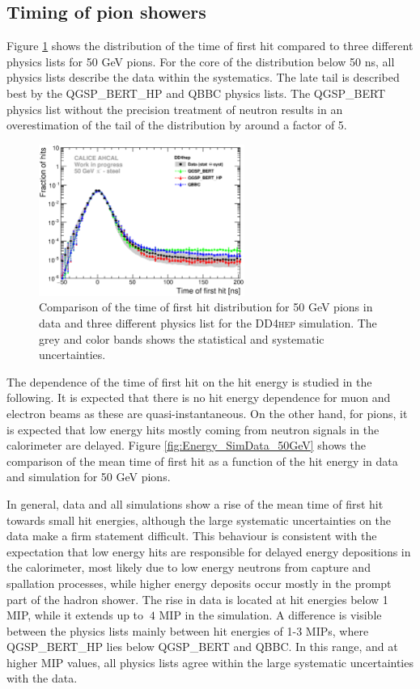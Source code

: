 \documentclass{JINST}
\newcommand\ddhep{\textsc{DD4hep}\xspace}
\begin{document}
\subsection{Timing of pion showers}

Figure \ref{fig:dNdt_SimData_50GeV_DD4hep} shows the distribution of the time of first hit compared to three different physics lists for 50 GeV pions. For the core of the distribution below 50 ns, all physics lists describe the data within the systematics. The late tail is described best by the QGSP\_BERT\_HP and QBBC physics lists. The QGSP\_BERT physics list without the precision treatment of neutron results in an overestimation of the tail of the distribution by around a factor of 5.

\begin{figure}[htbp!]
  \centering
  \includegraphics[width=0.6\textwidth]{fig/Comparison_SimData_Pion50GeV_LateClusters_DD4hep.eps}
  \caption{Comparison of the time of first hit distribution for 50 GeV pions in data and three different physics list for the \ddhep simulation. The grey and color bands shows the statistical and systematic uncertainties.}
  \label{fig:dNdt_SimData_50GeV_DD4hep}
\end{figure}

The dependence of the time of first hit on the hit energy is studied in the following. It is expected that there is no hit energy dependence for muon and electron beams as these are quasi-instantaneous. On the other hand, for pions, it is expected that low energy hits mostly coming from neutron signals in the calorimeter are delayed. Figure \ref{fig:Energy_SimData_50GeV} shows the comparison of the mean time of first hit as a function of the hit energy in data and simulation for 50 GeV pions.

In general, data and all simulations show a rise of the mean time of first hit towards small hit energies, although the large systematic uncertainties on the data make a firm statement difficult. This behaviour is consistent with the expectation that low energy hits are responsible for delayed energy depositions in the calorimeter, most likely due to low energy neutrons from capture and spallation processes, while higher energy deposits occur mostly in the prompt part of the hadron shower. The rise in data is located at hit energies below 1 MIP, while it extends up to $~4$ MIP in the simulation. A difference is visible between the physics lists mainly between hit energies of 1-3 MIPs, where QGSP\_BERT\_HP lies below QGSP\_BERT and QBBC. In this range, and at higher MIP values, all physics lists agree within the large systematic uncertainties with the data.
\end{document}
